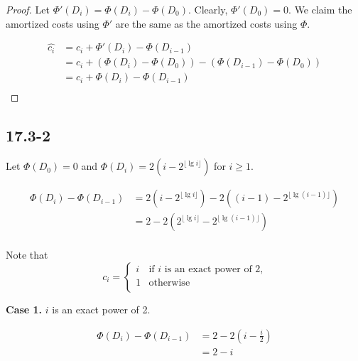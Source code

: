 \begin{proof}
    Let $\Phi'(D_i) = \Phi(D_i) - \Phi(D_0)$.
    Clearly, $\Phi'(D_0) = 0$.
    We claim the amortized costs using $\Phi'$ are the same
    as the amortized costs using $\Phi$.

    \begin{equation*}
        \begin{split}
            \hat{c_i} & = c_i + \Phi'(D_i) - \Phi(D_{i-1}) \\
            & = c_i + (\Phi(D_i) - \Phi(D_0)) - (\Phi(D_{i-1}) - \Phi(D_0)) \\
            & = c_i + \Phi(D_i) - \Phi(D_{i-1}) \\
        \end{split}
    \end{equation*}
\end{proof}
    
\subsection*{17.3-2}

Let $\Phi(D_0) = 0$ and $\Phi(D_i) = 2(i - 2^{\lfloor \lg i \rfloor})$
for $i \geq 1$.

\begin{equation*}
\begin{split}
    \Phi(D_i) - \Phi(D_{i - 1}) 
    & = 2(i - 2^{\lfloor \lg i \rfloor}) - 2((i - 1) - 2^{\lfloor \lg (i - 1) \rfloor}) \\
    & = 2 - 2(2^{\lfloor \lg i \rfloor} - 2^{\lfloor \lg (i - 1) \rfloor}) \\
\end{split}
\end{equation*}

Note that
\begin{equation*}
    c_i = 
    \begin{cases}
        i & \text{if $i$ is an exact power of 2,} \\
        1 & \text{otherwise} \\
    \end{cases}
\end{equation*}

\textbf{Case 1.}
$i$ is an exact power of 2.

\begin{equation*}
\begin{split}
    \Phi(D_i) - \Phi(D_{i - 1}) 
    & = 2 - 2(i - \frac{i}{2}) \\
    & = 2 - i \\
\end{split}
\end{equation*}

